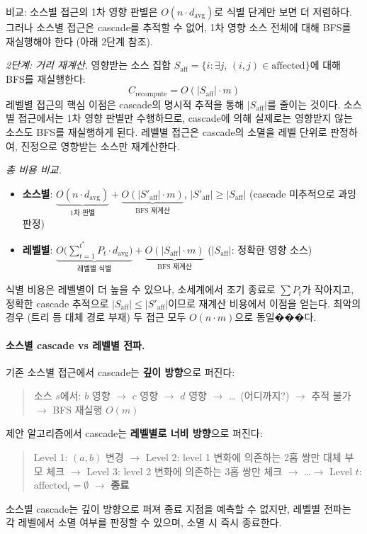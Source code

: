 \documentclass[11pt,a4paper]{article}
\begin{document}
비교: 소스별 접근의 1차 영향 판별은 $O(n \cdot d_{\text{avg}})$로 식별 단계만 보면 더 저렴하다. 그러나 소스별 접근은 cascade를 추적할 수 없어, 1차 영향 소스 전체에 대해 BFS를 재실행해야 한다 (아래 2단계 참조).

\noindent\textit{2단계: 거리 재계산.}
영향받는 소스 집합 $S_{\text{aff}} = \{i : \exists j,\, (i,j) \in \text{affected}\}$에 대해 BFS를 재실행한다:
\[
C_{\text{recompute}} = O(|S_{\text{aff}}| \cdot m)
\]
레벨별 접근의 핵심 이점은 cascade의 명시적 추적을 통해 $|S_{\text{aff}}|$를 줄이는 것이다. 소스별 접근에서는 1차 영향 판별만 수행하므로, cascade에 의해 실제로는 영향받지 않는 소스도 BFS를 재실행하게 된다. 레벨별 접근은 cascade의 소멸을 레벨 단위로 판정하여, 진정으로 영향받는 소스만 재계산한다.

\noindent\textit{총 비용 비교.}
\begin{itemize}[leftmargin=1.4em]
  \item \textbf{소스별}: $\underbrace{O(n \cdot d_{\text{avg}})}_{\text{1차 판별}} + \underbrace{O(|S'_{\text{aff}}| \cdot m)}_{\text{BFS 재계산}}$, \quad $|S'_{\text{aff}}| \geq |S_{\text{aff}}|$ (cascade 미추적으로 과잉 판정)
  \item \textbf{레벨별}: $\underbrace{O\!\big(\textstyle\sum_{t=1}^{t^*} P_t \cdot d_{\text{avg}}\big)}_{\text{레벨별 식별}} + \underbrace{O(|S_{\text{aff}}| \cdot m)}_{\text{BFS 재계산}}$ \quad ($|S_{\text{aff}}|$: 정확한 영향 소스)
\end{itemize}
식별 비용은 레벨별이 더 높을 수 있으나, 소세계에서 조기 종료로 $\sum P_t$가 작아지고, 정확한 cascade 추적으로 $|S_{\text{aff}}| \leq |S'_{\text{aff}}|$이므로 재계산 비용에서 이점을 얻는다. 최악의 경우 (트리 등 대체 경로 부재) 두 접근 모두 $O(n \cdot m)$으로 동일���다.

\paragraph{소스별 cascade vs 레벨별 전파.}
기존 소스별 접근에서 cascade는 \textbf{깊이 방향}으로 퍼진다:
\begin{quote}
소스 $s$에서: $b$ 영향 $\to$ $c$ 영향 $\to$ $d$ 영향 $\to$ \ldots\ (어디까지?) $\to$ 추적 불가 $\to$ BFS 재실행 $O(m)$
\end{quote}
제안 알고리즘에서 cascade는 \textbf{레벨별로 너비 방향}으로 퍼진다:
\begin{quote}
Level 1: $(a,b)$ 변경 $\to$ Level 2: level 1 변화에 의존하는 2홉 쌍만 대체 부모 체크 $\to$ Level 3: level 2 변화에 의존하는 3홉 쌍만 체크 $\to$ \ldots $\to$ Level $t$: $\text{affected}_{t} = \emptyset$ $\to$ \textbf{종료}
\end{quote}
소스별 cascade는 깊이 방향으로 퍼져 종료 지점을 예측할 수 없지만, 레벨별 전파는 각 레벨에서 소멸 여부를 판정할 수 있으며, 소멸 시 즉시 종료한다.
\end{document}

